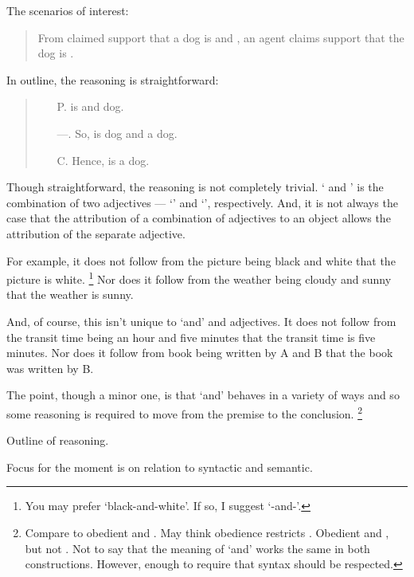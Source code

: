 \begin{note}
  The scenarios of interest:
  \begin{quote}
    From claimed support that a dog is \RIPa{} and \RIPb{}, an agent claims support that the dog is \RIPb{}.
  \end{quote}

  In outline, the reasoning is straightforward:
  \begin{quote}
    \begin{itemize}
    \item[P.]  is \RIPa{} and \RIPb{} dog.
    \item[---.] So,  is \RIPa{} dog and a \RIPb{} dog.
    \item[C.] Hence,  is a \RIPb{} dog.
    \end{itemize}
  \end{quote}

  Though straightforward, the reasoning is not completely trivial.
  `\RIPa{} and \RIPb{}' is the combination of two adjectives --- `\RIPa{}' and `\RIPb{}', respectively.
  And, it is not always the case that the attribution of a combination of adjectives to an object allows the attribution of the separate adjective.

  For example, it does not follow from the picture being black and white that the picture is white.\nolinebreak
  \footnote{
    You may prefer `black-and-white'.
    If so, I suggest `\RIPa{}-and-\RIPb{}'.
  }
  Nor does it follow from the weather being cloudy and sunny that the weather is sunny.

  And, of course, this isn't unique to `and' and adjectives.
  It does not follow from the transit time being an hour and five minutes that the transit time is five minutes.
  Nor does it follow from book being written by A and B that the book was written by B.

  The point, though a minor one, is that `and' behaves in a variety of ways and so some reasoning is required to move from the premise to the conclusion.
  \nolinebreak
  \footnote{
    Compare to obedient and \RIPb{}.
    May think obedience restricts \RIPb{}.
    Obedient and \RIPb{}, but not \RIPb{}.
    Not to say that the meaning of `and' works the same in both constructions.
    However, enough to require that syntax should be respected.
  }
\end{note}

\begin{note}
  Outline of reasoning.

  Focus for the moment is on relation to syntactic and semantic.

  
\end{note}


